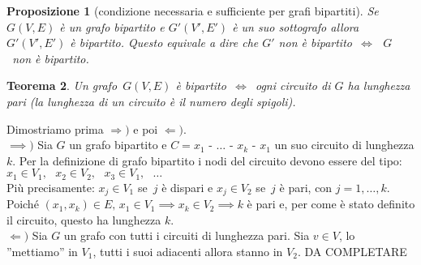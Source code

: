 \documentclass[a4paper, openany]{book}
\theoremstyle{plain}
\newtheorem{thm}{Teorema}[section]
\newtheorem{prop}[thm]{Proposizione}
\theoremstyle{definition}
\begin{document}
\begin{prop}[condizione necessaria e sufficiente per grafi bipartiti]
Se $G(V,E)$ è un grafo bipartito e $G'(V',E')$ è un suo sottografo allora
$G'(V',E')$ è bipartito.
Questo equivale a dire che $G'$ non è bipartito~$\iff \text{ } G$~non è bipartito. 
\end{prop}

\begin{thm}
Un grafo~$G(V,E)$ è bipartito~$\iff$~ogni circuito di $G$ ha lunghezza pari
(la lunghezza di un circuito è il numero degli spigoli).
\end{thm}
\proof
Dimostriamo prima $\Longrightarrow)$ e poi $\Longleftarrow)$.\\
$\implies)$ Sia $G$ un grafo bipartito e ${C = x_1\text{ - }\dots\text{ - }x_k\text{ - }x_1}$
un suo circuito di lunghezza $k$.
Per la definizione di grafo bipartito i nodi del circuito devono essere del tipo:
${x_1 \in V_1,}\text{ }{x_2 \in V_2,}\text{ }{x_3 \in V_1,\text{ }\dots}$\\ 
Più precisamente: ${x_j \in V_1}$ se~$j$ è dispari e ${x_j \in V_2}$ se~$j$ è pari, con
${j = 1,\dots,k}$.\\
Poiché ${(x_1, x_k) \in E} \text{, } {x_1 \in V_1 \implies x_k \in V_2 \implies k}$ è pari
e, per come è stato definito il circuito, questo ha lunghezza $k$.\\
$\Longleftarrow)$ Sia $G$ un grafo con tutti i circuiti di lunghezza pari. Sia $v \in V$,
lo ''mettiamo'' in $V_1$, tutti i suoi adiacenti allora stanno in $V_2$.
DA COMPLETARE
\begin{figure}[!ht]
    \centering
\end{figure}
\endproof
\end{document}
